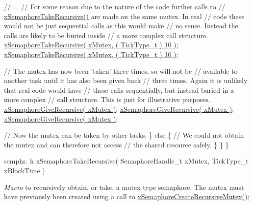 \begin{DoxyPre}         // ...
         // For some reason due to the nature of the code further calls to
         // \hyperlink{vendor_2ceedling_2plugins_2freertos_2src_2freertos_2include_2semphr_8h_ad395f4bba51eea6af3397d72bc079e4d}{xSemaphoreTakeRecursive()} are made on the same mutex.  In real
         // code these would not be just sequential calls as this would make
         // no sense.  Instead the calls are likely to be buried inside
         // a more complex call structure.
         \hyperlink{vendor_2ceedling_2plugins_2freertos_2src_2freertos_2include_2semphr_8h_ad395f4bba51eea6af3397d72bc079e4d}{xSemaphoreTakeRecursive( xMutex, ( TickType\_t ) 10 )};
         \hyperlink{vendor_2ceedling_2plugins_2freertos_2src_2freertos_2include_2semphr_8h_ad395f4bba51eea6af3397d72bc079e4d}{xSemaphoreTakeRecursive( xMutex, ( TickType\_t ) 10 )};\end{DoxyPre}



\begin{DoxyPre}         // The mutex has now been 'taken' three times, so will not be
         // available to another task until it has also been given back
         // three times.  Again it is unlikely that real code would have
         // these calls sequentially, but instead buried in a more complex
         // call structure.  This is just for illustrative purposes.
         \hyperlink{vendor_2ceedling_2plugins_2freertos_2src_2freertos_2include_2semphr_8h_a398d66b17856c22dd49d39aaac42f105}{xSemaphoreGiveRecursive( xMutex )};
         \hyperlink{vendor_2ceedling_2plugins_2freertos_2src_2freertos_2include_2semphr_8h_a398d66b17856c22dd49d39aaac42f105}{xSemaphoreGiveRecursive( xMutex )};
         \hyperlink{vendor_2ceedling_2plugins_2freertos_2src_2freertos_2include_2semphr_8h_a398d66b17856c22dd49d39aaac42f105}{xSemaphoreGiveRecursive( xMutex )};\end{DoxyPre}



\begin{DoxyPre}         // Now the mutex can be taken by other tasks.
     \}
     else
     \{
         // We could not obtain the mutex and can therefore not access
         // the shared resource safely.
     \}
 \}
\}
\end{DoxyPre}


semphr. h x\+Semaphore\+Take\+Recursive( Semaphore\+Handle\+\_\+t x\+Mutex, Tick\+Type\+\_\+t x\+Block\+Time )

{\itshape Macro} to recursively obtain, or \textquotesingle{}take\textquotesingle{}, a mutex type semaphore. The mutex must have previously been created using a call to \hyperlink{vendor_2ceedling_2plugins_2freertos_2src_2freertos_2include_2semphr_8h_a1bbc843be5a41ea83d2693b2189fc0f8}{x\+Semaphore\+Create\+Recursive\+Mutex()};

